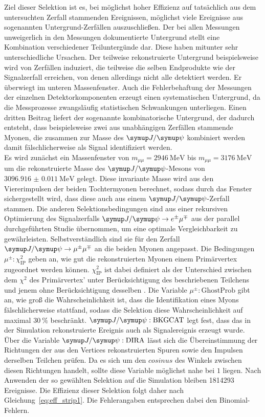 Ziel dieser Selektion ist es, bei möglichst hoher Effizienz auf tatsächlich aus dem untersuchten Zerfall stammenden Ereignissen, möglichst viele Ereignisse aus sogenannten Untergrund-Zerfällen auszuschließen. Der bei allen Messungen unweigerlich in den Messungen dokumentierte Untergrund stellt eine Kombination verschiedener Teiluntergünde dar. Diese haben mitunter sehr unterschiedliche Ursachen. Der teilweise rekonstruierte Untergrund beispielsweise wird von Zerfällen induziert, die teilweise die selben Endprodukte wie der Signalzerfall erreichen, von denen allerdings nicht alle detektiert werden. Er überwiegt im unteren Massenfenster. Auch die Fehlerbehaftung der Messungen der einzelnen Detektorkomponenten erzeugt einen systematischen Untergrund, da die Messprozesse zwangsläufig statistischen Schwankungen unterliegen. Einen dritten Beitrag liefert der sogenannte kombinatorische Untergrund, der dadurch entsteht, dass beispielsweise zwei aus unabhängigen Zerfällen stammende Myonen, die zusammen zur Masse des $\jpsi$ kombiniert werden damit fälschlicherweise als Signal identifiziert werden.\\
Es wird zunächst ein Massenfenster von $m_{\mu\mu}=\SI{2946}{\mega\electronvolt}$ bis $m_{\mu\mu}=\SI{3176}{\mega\electronvolt}$ um die rekonstruierte Masse des $\jpsi$-Mesons von $\SI{3096.916(11)}{\mega\electronvolt}$ \cite{pdg} gelegt. Diese invariante Masse wird aus den Viererimpulsen der beiden Tochtermyonen berechnet, sodass durch das Fenster sichergestellt wird, dass diese auch aus einem $\jpsi$-Zerfall stammen. Die anderen Selektionsbedingungen sind aus einer rekursiven Optimierung des Signalzerfalls $\signal$ aus der parallel durchgeführten Studie \cite{ba-maik} übernommen, um eine optimale Vergleichbarkeit zu gewährleisten. Selbstverständlich sind sie für den Zerfall $\kontroll$ an die beiden Myonen angepasst.
Die Bedingungen $\mu^{\pm}:\chi_{\text{IP}}^2$ geben an, wie gut die rekonstruierten Myonen einem Primärvertex zugeordnet werden können. $\chi_{\text{IP}}^2$ ist dabei definiert als der Unterschied zwischen dem $\chi^2$ des Primärvertex' unter Berücksichtigung des beschriebenen
Teilchens und jenem ohne Berücksichtigung desselben \cite{chi2}. Die Variable $\mu^{\pm}:\text{GhostProb}$ gibt an, wie groß die Wahrscheinlichkeit
ist, dass die Identifikation eines Myons fälschlicherweise stattfand, sodass die Selektion diese Wahrscheinlichkeit auf maximal $\SI{30}{\percent}$
beschränkt. $\jpsi:\text{BKGCAT}$ legt fest, dass das in der Simulation rekonstruierte Ereignis auch als Signalereignis erzeugt wurde. Über die Variable $\jpsi:\text{DIRA}$ lässt sich die Übereinstimmung der Richtungen der aus den Vertices rekonstruierten Spuren sowie den Impulsen derselben Teilchen prüfen. Da es sich um den $cosinus$ des Winkels zwischen diesen Richtungen handelt, sollte diese Variable möglichst nahe bei $1$ liegen. Nach Anwenden der so gewählten Selektion auf die Simulation bleiben 1814293 Ereignisse. Die Effizienz dieser Selektion folgt daher nach Gleichung~\eqref{eq:eff_strip1}. Die Fehlerangaben entsprechen dabei den Binomial-Fehlern.
